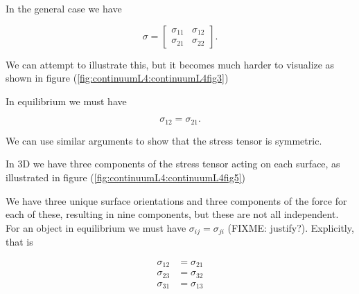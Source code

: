 In the general case we have

\begin{equation}\label{eqn:continuumL4:70}
\sigma = 
\begin{bmatrix}
\sigma_{11} & \sigma_{12} \\
\sigma_{21} & \sigma_{22}
\end{bmatrix}.
\end{equation}

We can attempt to illustrate this, but it becomes much harder to visualize as shown in figure (\ref{fig:continuumL4:continuumL4fig3})

In equilibrium we must have

\begin{equation}\label{eqn:continuumL4:90}
\sigma_{12} = \sigma_{21}.
\end{equation}

We can use similar arguments to show that the stress tensor is symmetric.

In 3D we have three components of the stress tensor acting on each surface, as illustrated in figure (\ref{fig:continuumL4:continuumL4fig5})

We have three unique surface orientations and three components of the force for each of these, resulting in nine components, but these are not all independent.  For an object in equilibrium we must have $\sigma_{ij} = \sigma_{ji}$ (FIXME: justify?).  Explicitly, that is

\begin{align}\label{eqn:continuumL4:110}
\sigma_{12} &= \sigma_{21} \\
\sigma_{23} &= \sigma_{32} \\
\sigma_{31} &= \sigma_{13}
\end{align}

